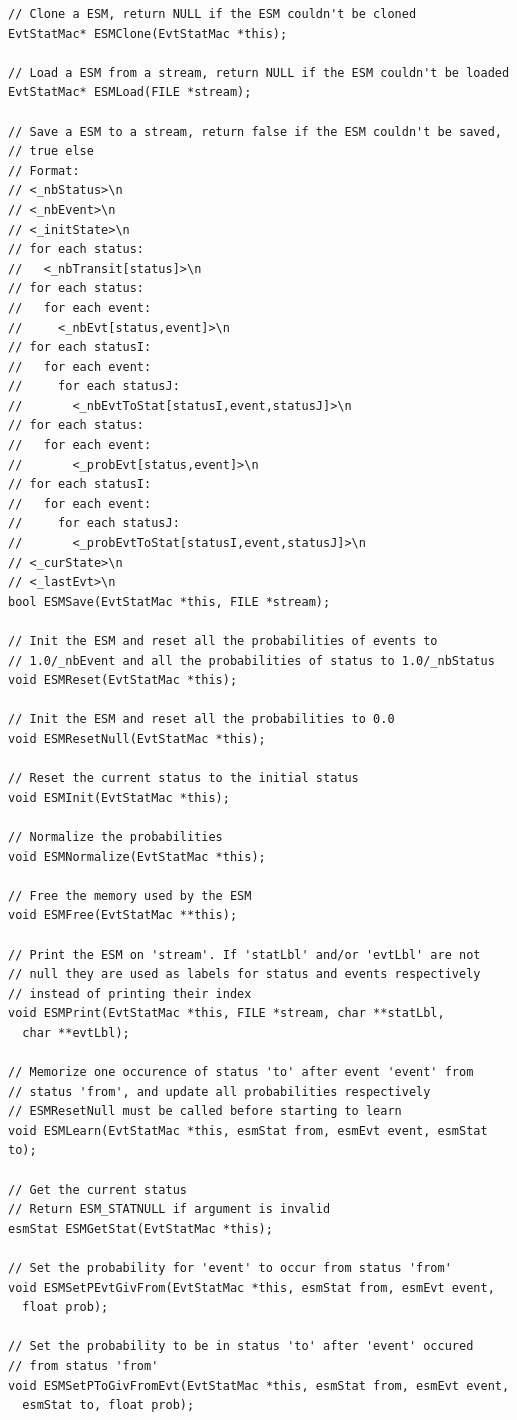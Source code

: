\documentclass[12pt, a4paper]{article}
\begin{document}
\begin{scriptsize}
\begin{ttfamily}
\begin{lstlisting}
// Clone a ESM, return NULL if the ESM couldn't be cloned
EvtStatMac* ESMClone(EvtStatMac *this);

// Load a ESM from a stream, return NULL if the ESM couldn't be loaded
EvtStatMac* ESMLoad(FILE *stream);

// Save a ESM to a stream, return false if the ESM couldn't be saved,
// true else
// Format:
// <_nbStatus>\n
// <_nbEvent>\n
// <_initState>\n
// for each status:
//   <_nbTransit[status]>\n
// for each status:
//   for each event:
//     <_nbEvt[status,event]>\n
// for each statusI:
//   for each event:
//     for each statusJ:
//       <_nbEvtToStat[statusI,event,statusJ]>\n
// for each status:
//   for each event:
//       <_probEvt[status,event]>\n
// for each statusI:
//   for each event:
//     for each statusJ:
//       <_probEvtToStat[statusI,event,statusJ]>\n
// <_curState>\n
// <_lastEvt>\n
bool ESMSave(EvtStatMac *this, FILE *stream);

// Init the ESM and reset all the probabilities of events to 
// 1.0/_nbEvent and all the probabilities of status to 1.0/_nbStatus
void ESMReset(EvtStatMac *this);

// Init the ESM and reset all the probabilities to 0.0
void ESMResetNull(EvtStatMac *this);

// Reset the current status to the initial status
void ESMInit(EvtStatMac *this);

// Normalize the probabilities
void ESMNormalize(EvtStatMac *this);

// Free the memory used by the ESM
void ESMFree(EvtStatMac **this);

// Print the ESM on 'stream'. If 'statLbl' and/or 'evtLbl' are not 
// null they are used as labels for status and events respectively 
// instead of printing their index
void ESMPrint(EvtStatMac *this, FILE *stream, char **statLbl, 
  char **evtLbl);

// Memorize one occurence of status 'to' after event 'event' from
// status 'from', and update all probabilities respectively
// ESMResetNull must be called before starting to learn
void ESMLearn(EvtStatMac *this, esmStat from, esmEvt event, esmStat to);

// Get the current status
// Return ESM_STATNULL if argument is invalid
esmStat ESMGetStat(EvtStatMac *this);

// Set the probability for 'event' to occur from status 'from'
void ESMSetPEvtGivFrom(EvtStatMac *this, esmStat from, esmEvt event, 
  float prob);

// Set the probability to be in status 'to' after 'event' occured 
// from status 'from'
void ESMSetPToGivFromEvt(EvtStatMac *this, esmStat from, esmEvt event, 
  esmStat to, float prob);


\end{lstlisting}
\end{ttfamily}
\end{scriptsize}
\end{document}
